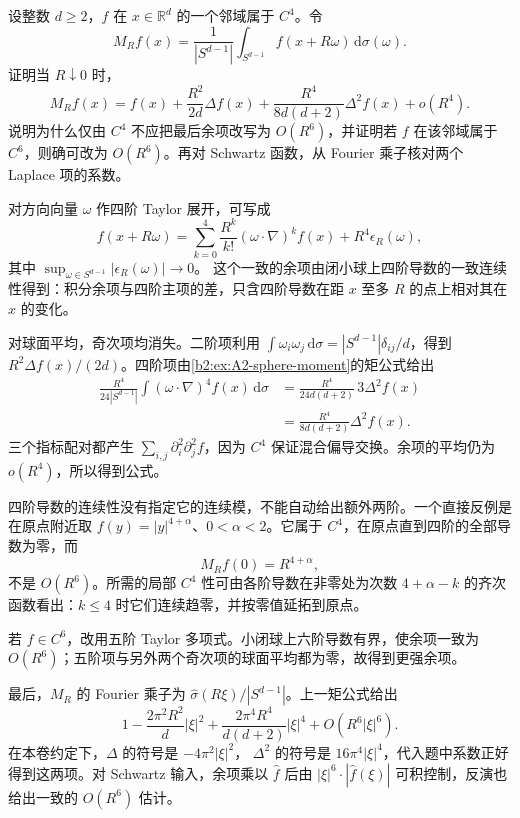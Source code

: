 \begin{exercise}\label{b2:ex:A2-small-sphere-average}
设整数 \(d\geq2\)，\(f\) 在 \(x\in\mathbb R^d\) 的一个邻域属于 \(C^4\)。令
\[
 M_Rf(x)=\frac1{|S^{d-1}|}
       \int_{S^{d-1}}f(x+R\omega)\,\mathrm d\sigma(\omega).
\]
证明当 \(R\downarrow0\) 时，
\[
 M_Rf(x)
 =f(x)+\frac{R^2}{2d}\Delta f(x)
       +\frac{R^4}{8d(d+2)}\Delta^2f(x)+o(R^4).
\]
说明为什么仅由 \(C^4\) 不应把最后余项改写为 \(O(R^6)\)，并证明若 \(f\) 在该邻域属于 \(C^6\)，则确可改为 \(O(R^6)\)。再对 Schwartz 函数，从 Fourier 乘子核对两个 Laplace 项的系数。
\end{exercise}
\begin{solution}
对方向向量 \(\omega\) 作四阶 Taylor 展开，可写成
\[
 f(x+R\omega)
 =\sum_{k=0}^4\frac{R^k}{k!}(\omega\cdot\nabla)^kf(x)
       +R^4\epsilon_R(\omega),
\]
其中 \(\sup_{\omega\in S^{d-1}}|\epsilon_R(\omega)|\to0\)。
这个一致的余项由闭小球上四阶导数的一致连续性得到：积分余项与四阶主项的差，只含四阶导数在距 \(x\) 至多 \(R\) 的点上相对其在 \(x\) 的变化。

对球面平均，奇次项均消失。二阶项利用
\(\int\omega_i\omega_j\,\mathrm d\sigma=|S^{d-1}|\delta_{ij}/d\)，得到
\(R^2\Delta f(x)/(2d)\)。四阶项由\cref{b2:ex:A2-sphere-moment}的矩公式给出
\[
 \begin{aligned}
 \frac{R^4}{24|S^{d-1}|}
       \int(\omega\cdot\nabla)^4f(x)\,\mathrm d\sigma
 &=\frac{R^4}{24d(d+2)}\,3\Delta^2f(x)\\
 &=\frac{R^4}{8d(d+2)}\Delta^2f(x).
 \end{aligned}
\]
三个指标配对都产生 \(\sum_{i,j}\partial_i^2\partial_j^2f\)，因为 \(C^4\) 保证混合偏导交换。余项的平均仍为 \(o(R^4)\)，所以得到公式。

四阶导数的连续性没有指定它的连续模，不能自动给出额外两阶。一个直接反例是在原点附近取
\(f(y)=|y|^{4+\alpha}\)、\(0<\alpha<2\)。它属于 \(C^4\)，在原点直到四阶的全部导数为零，而
\[
 M_Rf(0)=R^{4+\alpha},
\]
不是 \(O(R^6)\)。所需的局部 \(C^4\) 性可由各阶导数在非零处为次数
\(4+\alpha-k\) 的齐次函数看出：\(k\leq4\) 时它们连续趋零，并按零值延拓到原点。

若 \(f\in C^6\)，改用五阶 Taylor 多项式。小闭球上六阶导数有界，使余项一致为 \(O(R^6)\)；五阶项与另外两个奇次项的球面平均都为零，故得到更强余项。

最后，\(M_R\) 的 Fourier 乘子为
\(\widehat\sigma(R\xi)/|S^{d-1}|\)。上一矩公式给出
\[
 1-\frac{2\pi^2R^2}{d}|\xi|^2
       +\frac{2\pi^4R^4}{d(d+2)}|\xi|^4
       +O(R^6|\xi|^6).
\]
在本卷约定下，\(\Delta\) 的符号是 \(-4\pi^2|\xi|^2\)，
\(\Delta^2\) 的符号是 \(16\pi^4|\xi|^4\)，代入题中系数正好得到这两项。对 Schwartz 输入，余项乘以 \(\widehat f\) 后由
\(|\xi|^6\cdot|\widehat f(\xi)|\) 可积控制，反演也给出一致的 \(O(R^6)\) 估计。
\end{solution}

